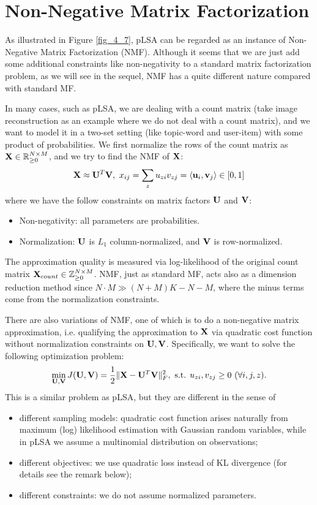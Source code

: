 \documentclass[../main.tex]{subfiles}
\begin{document}
\section{Non-Negative Matrix Factorization}
As illustrated in Figure \ref{fig_4_7}, pLSA can be regarded as an instance of Non-Negative Matrix Factorization (NMF). Although it seems that we are just add some additional constraints like non-negativity to a standard matrix factorization problem, as we will see in the sequel, NMF has a quite different nature compared with standard MF.
\par In many cases, such as pLSA, we are dealing with a count matrix (take image reconstruction as an example where we do not deal with a count matrix), and we want to model it in a two-set setting (like topic-word and user-item) with some product of probabilities. We first normalize the rows of the count matrix as ${\bf X}\in \mathbb{R}^{N\times M}_{\geq 0}$, and we try to find the NMF of ${\bf X}$:
\begin{equation*}
{\bf X}\approx {\bf U}^T{\bf V},\ x_{ij}=\sum_{z}u_{zi}v_{zj}=\langle{\bf u}_i,{\bf v}_j\rangle\in [0,1]
\end{equation*}
where we have the follow constraints on matrix factors ${\bf U}$ and ${\bf V}$:
\begin{itemize}
	\item Non-negativity: all parameters are probabilities.
	\item Normalization: ${\bf U}$ is $L_1$ column-normalized, and ${\bf V}$ is row-normalized.
\end{itemize}
The approximation quality is measured via log-likelihood of the original count matrix ${\bf X}_{count}\in \mathbb{Z}^{N\times M}_{\geq 0}$. NMF, just as standard MF, acts also as a dimension reduction method since $N\cdot M\gg (N+M)K-N-M$, where the minus terms come from the normalization constraints.
\par There are also variations of NMF, one of which is to do a non-negative matrix approximation, i.e. qualifying the approximation to ${\bf X}$ via quadratic cost function without normalization constraints on ${\bf U,V}$. Specifically, we want to solve the following optimization problem:
\begin{equation}\label{eq_4_NMF_q_obj}
\min_{{\bf U,V}}J({\bf U,V})=\frac{1}{2}\|{\bf X}-{\bf U}^T{\bf V}\|_F^2,\ \text{s.t. } u_{zi},v_{zj}\geq 0\ (\forall i,j,z).
\end{equation}
This is a similar problem as pLSA, but they are different in the sense of
\begin{itemize}
	\item different sampling models: quadratic cost function arises naturally from maximum (log) likelihood estimation with Gaussian random variables, while in pLSA we assume a multinomial distribution on observations;
	\item different objectives: we use quadratic loss instead of KL divergence (for details see the remark below);
	\item different constraints: we do not assume normalized parameters.
\end{itemize}
\end{document}
